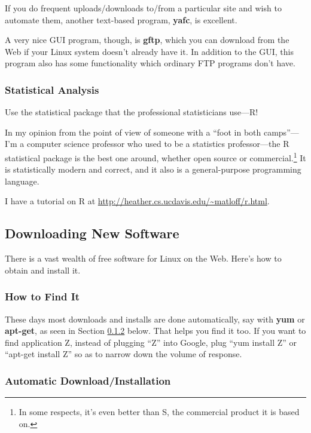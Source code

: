 \documentclass[11pt]{article}
\begin{document}
If you do frequent uploads/downloads to/from a particular site and wish
to automate them, another text-based program, {\bf yafc}, is excellent.

A very nice GUI program, though, is {\bf gftp}, which you can download
from the Web if your Linux system doesn't already have it.  In addition
to the GUI, this program also has some functionality which ordinary FTP
programs don't have.

\subsubsection{Statistical Analysis}

Use the statistical package that the professional statisticians use---R!

In my opinion from the point of view of someone with a ``foot in both
camps''---I'm a computer science professor who used to be a statistics
professor---the R statistical package is the best one around, whether
open source or commercial.\footnote{In some respects, it's even better
than S, the commercial product it is based on.} It is statistically
modern and correct, and it also is a general-purpose programming
language.  

I have a tutorial on R at \url{http://heather.cs.ucdavis.edu/~matloff/r.html}.

\subsection{Downloading New Software}

There is a vast wealth of free software for Linux on the Web.  Here's
how to obtain and install it.

\subsubsection{How to Find It}

These days most downloads and installs are done automatically, say with
{\bf yum} or {\bf apt-get}, as seen in Section \ref{yum} below.  That
helps you find it too.  If you want to find application Z, instead of
plugging ``Z'' into Google, plug ``yum install Z'' or ``apt-get install
Z'' so as to narrow down the volume of response.

\subsubsection{Automatic Download/Installation}
\label{yum}
\end{document}
